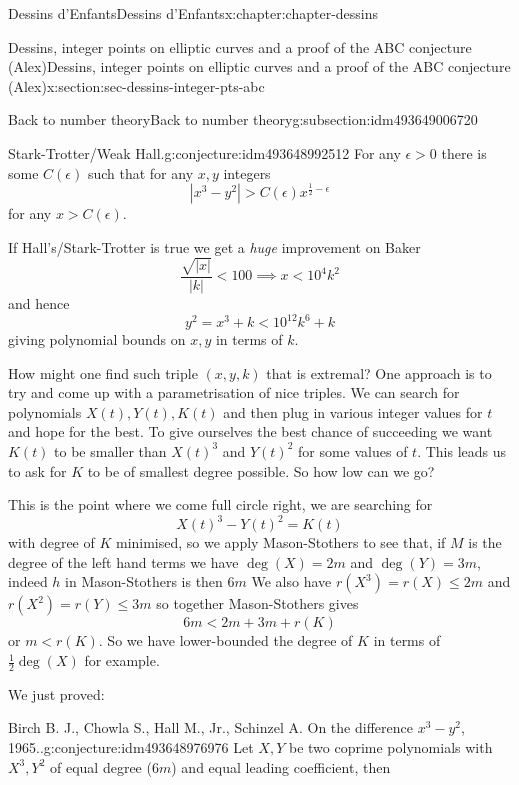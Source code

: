 \documentclass[oneside,10pt,]{book}
\numberwithin{equation}{section}
\newcommand{\lt}{<}
\newcommand{\gt}{>}
\begin{document}
\begin{chapterptx}{Dessins d'Enfants}{}{Dessins d'Enfants}{}{}{x:chapter:chapter-dessins}
\begin{sectionptx}{Dessins, integer points on elliptic curves and a proof of the ABC conjecture (Alex)}{}{Dessins, integer points on elliptic curves and a proof of the ABC conjecture (Alex)}{}{}{x:section:sec-dessins-integer-pts-abc}
\begin{subsectionptx}{Back to number theory}{}{Back to number theory}{}{}{g:subsection:idm493649006720}
\begin{conjecture}{Stark-Trotter\slash{}Weak Hall.}{}{g:conjecture:idm493648992512}%
For any  \(\epsilon \gt 0\) there is some \(C(\epsilon)\) such that for any \(x,y\) integers%
\begin{equation*}
|x^3 - y^2| \gt C(\epsilon) x^{\frac12 - \epsilon}
\end{equation*}
for any \(x \gt C(\epsilon)\).%
\end{conjecture}
If Hall's\slash{}Stark-Trotter is true we get a \emph{huge} improvement on Baker%
\begin{equation*}
\frac{\sqrt{|x|}}{|k|} \lt 100 \implies x \lt 10^4k^2
\end{equation*}
and hence%
\begin{equation*}
y^2 = x^3 + k \lt 10^{12}k^6 + k
\end{equation*}
giving polynomial bounds on \(x,y\) in terms of \(k\).%
\par
How might one find such triple \((x,y,k)\) that is extremal? One approach is to try and come up with a parametrisation of nice triples. We can search for polynomials \(X(t),Y(t), K(t)\) and then plug in various integer values for \(t\) and hope for the best. To give ourselves the best chance of succeeding we want \(K(t)\) to be smaller than \(X(t)^3\) and \(Y(t)^2\) for some values of \(t\). This leads us to ask for \(K\) to be of smallest degree possible. So how low can we go?%
\par
This is the point where we come full circle right, we are searching for%
\begin{equation*}
X(t)^3 - Y(t)^2 = K(t)
\end{equation*}
with degree of \(K\) minimised, so we apply Mason-Stothers to see that, if \(M\) is the degree of the left hand terms we have \(\deg(X) = 2m\) and \(\deg (Y) = 3m\), indeed \(h\) in Mason-Stothers is then \(6m\) We also have \(r(X^3) = r(X) \le 2m\) and \(r(X^2) = r(Y) \le 3m\) so together Mason-Stothers gives%
\begin{equation*}
6m \lt 2m + 3m + r(K)
\end{equation*}
or \(m \lt r(K)\). So we have lower-bounded the degree of \(K\) in terms of \(\frac 12 \deg(X)\) for example.%
\par
We just proved:%
\begin{conjecture}{Birch B. J., Chowla S., Hall M., Jr., Schinzel A. On the difference \(x^3 - y^2\), 1965..}{}{g:conjecture:idm493648976976}%
Let \(X, Y\) be two coprime polynomials with \(X^3,Y^2\) of equal degree (\(6m\)) and equal leading coefficient, then%

\end{conjecture}
\end{subsectionptx}
\end{sectionptx}
\end{chapterptx}
\end{document}
